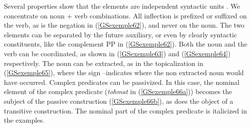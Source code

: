 \documentclass[output=paper
                ,modfonts
                ,nonflat
	        ,collection
	        ,collectionchapter
	        ,collectiontoclongg
 	        ,biblatex
                ,babelshorthands
                ,newtxmath
                ,draftmode
                ,colorlinks, citecolor=brown
]{./langsci/langscibook}
\begin{document}
{Several properties show that the elements are independent syntactic units \citep{Karimi-Doostan97a, megerdoomian2000beyond, pollet2012grammaire}. We concentrate on noun + verb combinations. All inflection is prefixed or suffixed on the verb, as is the negation in (\ref{GSexemple62}), and never on the noun. The two elements can be separated by the future auxiliary, or even by clearly syntactic constituents, like the complement PP in (\ref{GSexemple62}). Both the noun and the verb can be coordinated, as shown in (\ref{GSexemple63}) and (\ref{GSexemple64}) respectively. The noun can be extracted, as in the topicalization in (\ref{GSexemple65}), where the sign --indicates where the non extracted noun would have occurred. Complex predicates can be passivized. In this case, the nominal element of the complex predicate (\textit{tohmat} in (\ref{GSexemple66a})) becomes the subject of the passive construction (\ref{GSexemple66b}), as does the object of a transitive construction. The nominal part of the complex predicate is italicized in the examples.

\begin{exe}
	\label{GSexemple62}
\end{exe}

\begin{exe}
	\label{GSexemple63}
\end{exe}

\begin{exe}
	\label{GSexemple64}
\end{exe}

\begin{exe}
	\label{GSexemple65}
\end{exe}

}
\end{document}
